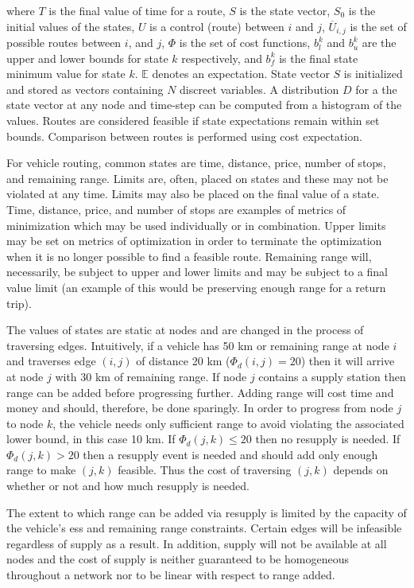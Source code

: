 \noindent where $T$ is the final value of time for a route, $S$ is the state vector, $S_0$ is the initial values of the states, $U$ is a control (route) between $i$ and $j$, $\overline{U}_{i,j}$ is the set of possible routes between $i$, and $j$, $\Phi$ is the set of cost functions, $b^k_l$ and $b^k_u$ are the upper and lower bounds for state $k$ respectively, and $b^k_f$ is the final state minimum value for state $k$. $\mathbb{E}$ denotes an expectation. State vector $S$ is initialized and stored as vectors containing $N$ discreet variables. A distribution $D$ for a the state vector at any node and time-step can be computed from a histogram of the values. Routes are considered feasible if state expectations remain within set bounds. Comparison between routes is performed using cost expectation.

For vehicle routing, common states are time, distance, price, number of stops, and remaining range. Limits are, often, placed on states and these may not be violated at any time. Limits may also be placed on the final value of a state. Time, distance, price, and number of stops are examples of metrics of minimization which may be used individually or in combination. Upper limits may be set on metrics of optimization in order to terminate the optimization when it is no longer possible to find a feasible route. Remaining range will, necessarily, be subject to upper and lower limits and may be subject to a final value limit (an example of this would be preserving enough range for a return trip).

The values of states are static at nodes and are changed in the process of traversing edges. Intuitively, if a vehicle has 50 km or remaining range at node $i$ and traverses edge $(i, j)$ of distance 20 km ($\Phi_d(i,j) = 20$) then it will arrive at node $j$ with 30 km of remaining range. If node $j$ contains a supply station then range can be added before progressing further. Adding range will cost time and money and should, therefore, be done sparingly. In order to progress from node $j$ to node $k$, the vehicle needs only sufficient range to avoid violating the associated lower bound, in this case 10 km. If $\Phi_d(j,k) \leq 20$ then no resupply is needed. If $\Phi_d(j,k) > 20$ then a resupply event is needed and should add only enough range to make $(j,k)$ feasible. Thus the cost of traversing $(j,k)$ depends on whether or not and how much resupply is needed. 

The extent to which range can be added via resupply is limited by the capacity of the vehicle's \gls{ess} and remaining range constraints. Certain edges will be infeasible regardless of supply as a result. In addition, supply will not be available at all nodes and the cost of supply is neither guaranteed to be homogeneous throughout a network nor to be linear with respect to range added.

